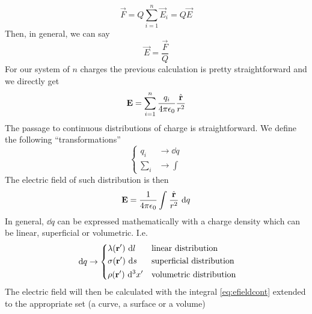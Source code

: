 \documentclass[../electromagnetism]{subfiles}
\begin{document}
\begin{equation}
	\vec{F}=Q\sum_{i=1}^n\vec{E}_i=Q\vec{E}
	\label{eq:esfield}
\end{equation}
Then, in general, we can say
\begin{equation}
	\vec{E}=\frac{\vec{F}}{Q}
	\label{eq:efielddef}
\end{equation}
For our system of $n$ charges the previous calculation is pretty straightforward and we directly get
\begin{equation}
	\mathbf{E}=\sum_{i=1}^n\frac{q_i}{4\pi\epsilon_0}\frac{\hat{\mathbf{r}}}{r^2}
	\label{eq:esfieldsystem}
\end{equation}
The passage to continuous distributions of charge is straightforward. We define the following ``transformations''
\begin{equation*}
	\left\{ \begin{aligned}
		q_i&\longrightarrow\dd q\\
		\sum_i&\longrightarrow\int
\end{aligned}\right.
\end{equation*}
The electric field of such distribution is then
\begin{equation}
	\mathbf{E}=\frac{1}{4\pi\epsilon_0}\int_{}^{}\frac{\hat{\mathbf{r}}}{r^2}\ \mathrm{d} q
	\label{eq:efieldcont}
\end{equation}
In general, $\dd q$ can be expressed mathematically with a charge density which can be linear, superficial or volumetric. I.e.
\begin{equation}
	\ \mathrm{d} q\to\begin{dcases}
		\lambda(\mathbf{r}')\ \mathrm{d} l&\text{linear distribution}\\
		\sigma(\mathbf{r}')\ \mathrm{d} s&\text{superficial distribution}\\
		\rho(\mathbf{r}')\ \mathrm{d}^3x'&\text{volumetric distribution}
	\end{dcases}
	\label{eq:chargedist}
\end{equation}
The electric field will then be calculated with the integral \eqref{eq:efieldcont} extended to the appropriate set (a curve, a surface or a volume)
\end{document}
